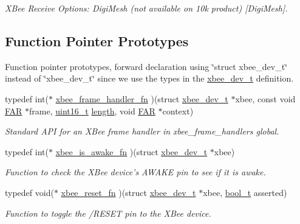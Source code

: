 \begin{DoxyCompactItemize}
\begin{DoxyCompactList}\small\item\em X\-Bee Receive Options\-: Digi\-Mesh (not available on 10k product) \mbox{[}Digi\-Mesh\mbox{]}. \end{DoxyCompactList}\end{DoxyCompactItemize}
\subsection*{Function Pointer Prototypes}
\label{_amgrp2f5754cb0cad19832264f831971ef24c}%
Function pointer prototypes, forward declaration using \char`\"{}struct xbee\-\_\-dev\-\_\-t\char`\"{} instead of \char`\"{}xbee\-\_\-dev\-\_\-t\char`\"{} since we use the types in the \hyperlink{structxbee__dev__t}{xbee\-\_\-dev\-\_\-t} definition. \begin{DoxyCompactItemize}
\item 
typedef int($\ast$ \hyperlink{group__xbee__device_ga3d8f20fa50d6f72eaf03f0cdd4c9832b}{xbee\-\_\-frame\-\_\-handler\-\_\-fn} )(struct \hyperlink{structxbee__dev__t}{xbee\-\_\-dev\-\_\-t} $\ast$xbee, const void \hyperlink{group__hal_gaef060b3456fdcc093a7210a762d5f2ed}{F\-A\-R} $\ast$frame, \hyperlink{group__hal_ga5a8b2dc9e45a9ee81a94ef304fb62505}{uint16\-\_\-t} \hyperlink{group__zdo_gab2b3adeb2a67e656ff030b56727fd0ac}{length}, void \hyperlink{group__hal_gaef060b3456fdcc093a7210a762d5f2ed}{F\-A\-R} $\ast$context)
\begin{DoxyCompactList}\small\item\em Standard A\-P\-I for an X\-Bee frame handler in xbee\-\_\-frame\-\_\-handlers global. \end{DoxyCompactList}\item 
typedef int($\ast$ \hyperlink{group__xbee__device_gace56b1c8dd7dc5a23f6fa01878d45b09}{xbee\-\_\-is\-\_\-awake\-\_\-fn} )(struct \hyperlink{structxbee__dev__t}{xbee\-\_\-dev\-\_\-t} $\ast$xbee)
\begin{DoxyCompactList}\small\item\em Function to check the X\-Bee device's A\-W\-A\-K\-E pin to see if it is awake. \end{DoxyCompactList}\item 
typedef void($\ast$ \hyperlink{group__xbee__device_ga7f2f41997c6215582cf3491c984b31ea}{xbee\-\_\-reset\-\_\-fn} )(struct \hyperlink{structxbee__dev__t}{xbee\-\_\-dev\-\_\-t} $\ast$xbee, \hyperlink{group__hal_ga04dd5074964518403bf944f2b240a5f8}{bool\-\_\-t} asserted)
\begin{DoxyCompactList}\small\item\em Function to toggle the /\-R\-E\-S\-E\-T pin to the X\-Bee device. \end{DoxyCompactList}\item 

\end{DoxyCompactItemize}
